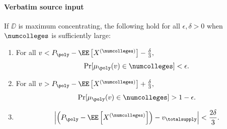 \documentclass[10pt]{article}
\begin{document}
\paragraph{Verbatim source input}
\begin{ReviewVerbatim}
\begin{lemma}\label{lem:potato}
If $\DD$ is maximum concentrating, the following hold for all $\epsilon, \delta > 0$ when $\numcolleges$ is sufficiently large:
\begin{enumerate}
    \item[(i)] For all $v < P_{\poly} - \EE\left[X^{(\numcolleges)}\right] - \frac{\delta}{3},$
    \begin{equation}
        \Pr[\mu_{\poly}(v)\in \numcolleges] < \epsilon.
    \end{equation}
    \item[(ii)] For all $v > P_{\poly} - \EE\left[X^{(\numcolleges)}\right] + \frac{\delta}{3},$
    \begin{equation}
        \Pr[\mu_{\poly}(v)\in \numcolleges] > 1 - \epsilon.
    \end{equation}
    \item[(iii)]
    \begin{equation}
\left|\left(P_{\poly} - \EE\left[X^{(\numcolleges)}\right]\right) - v_\totalsupply\right| < \frac{2\delta}{3}.
    \end{equation}
\end{enumerate}
\end{lemma}
\end{ReviewVerbatim}
\end{document}
